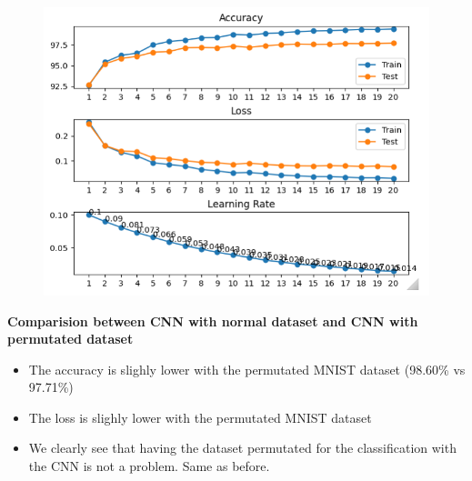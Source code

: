\documentclass[10pt,a4paper,fullpage]{article}
\begin{document}
\begin{figure}[H]
	\begin{center}
		\includegraphics[scale=1]{cnn_model_plot_permutated.png}
	\end{center}
\end{figure}

\textbf{Comparision between CNN with normal dataset and CNN with permutated dataset}
\begin{itemize}
	\item The accuracy is slighly lower with the permutated MNIST dataset (98.60\% vs 97.71\%)
	\item The loss is slighly lower with the permutated MNIST dataset
	\item We clearly see that having the dataset permutated for the classification with the CNN is not a problem. Same as before.
\end{itemize}
\end{document}
